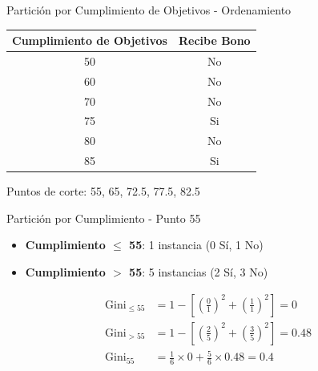 \documentclass{beamer}
\begin{document}
\begin{frame}{Partición por Cumplimiento de Objetivos - Ordenamiento}
    \begin{center}
        \begin{tabular}{cc}
            \toprule
            Cumplimiento de Objetivos & Recibe Bono \\
            \midrule
            50 & No \\
            60 & No \\
            70 & No \\
            75 & Si \\
            80 & No \\
            85 & Si \\
            \bottomrule
        \end{tabular}
    \end{center}
    
    \vspace{1em}
    
    \begin{center}
        \Large Puntos de corte: 55, 65, 72.5, 77.5, 82.5
    \end{center}
\end{frame}

\begin{frame}{Partición por Cumplimiento - Punto 55}
    \begin{itemize}
        \item \textbf{Cumplimiento $\leq$ 55}: 1 instancia (0 Sí, 1 No)
        \item \textbf{Cumplimiento $>$ 55}: 5 instancias (2 Sí, 3 No)
    \end{itemize}
    
    \vspace{0.5em}
    
    \begin{align*}
        \mathrm{Gini}_{\leq 55} &= 1 - \left[\left(\tfrac{0}{1}\right)^2 + \left(\tfrac{1}{1}\right)^2\right] = 0 \\
        \mathrm{Gini}_{> 55} &= 1 - \left[\left(\tfrac{2}{5}\right)^2 + \left(\tfrac{3}{5}\right)^2\right] = 0.48 \\
        \mathrm{Gini}_{\text{55}} &= \tfrac{1}{6}\times0 + \tfrac{5}{6}\times0.48 = 0.4
    \end{align*}
\end{frame}
\end{document}
